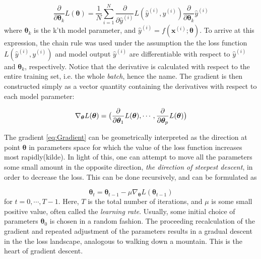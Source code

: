 \begin{equation}\label{eq:LossDerivateWRTparameter}
    \frac{\partial}{\partial \boldsymbol{\theta}_k} L(\boldsymbol{\theta}) =
    \frac{1}{N}\sum_{i=1}^{N} \frac{\partial}{\partial \hat{y}^{(i)}} L( \hat{y}^{(i)}, y^{(i)})
    \frac{\partial}{\partial \boldsymbol{\theta}_k}\hat{y}^{(i)}
\end{equation}
where $\boldsymbol{\theta}_k$ is the k'th model parameter, and  $\hat{y}^{(i)} = f(\boldsymbol{x}^{(i)}; \boldsymbol{\theta})$. To arrive at this expression, the chain rule was used under the assumption the the loss function $L(\hat{y}^{(i)}, y^{(i)})$ and model output $\hat{y}^{(i)}$ are differentiable with respect to $\hat{y}^{(i)}$ and $\boldsymbol{\theta}_k$, respectively. Notice that the derivative is calculated with respect to the entire training set, i.e. the whole \emph{batch}, hence the name. The gradient is then constructed simply as a vector quantity containing the derivatives with respect to each model parameter:

\begin{equation}\label{eq:Gradient}
    \nabla_{\boldsymbol{\theta}} L(\boldsymbol{\theta})= 
    \big{(} \frac{\partial}{\partial \boldsymbol{\theta}_1} L(\boldsymbol{\theta}), 
    \cdots, \frac{\partial}{\partial \boldsymbol{\theta}_p} L(\boldsymbol{\theta}) \big{)}
\end{equation}

The gradient \autoref{eq:Gradient} can be geometrically interpreted as  the direction at point $\boldsymbol{\theta}$ in parameters space for which the value of the loss function increases most rapidly(kilde). In light of this, one can attempt to move all the parameters some small amount in the opposite direction, \emph{the direction of steepest descent}, in order to decrease the loss. This can be done recursively, and can be formulated as 


\begin{equation}\label{eq:ParameterUpdate}
    \boldsymbol{\theta}_{t} = \boldsymbol{\theta}_{t-1} - \mu \nabla_{\boldsymbol{\theta}} L(\boldsymbol{\theta}_{t-1})
\end{equation}
for $t=0, \cdots, T-1$. Here, $T$ is the total number of iterations, and $\mu$ is some small positive value, often called the \emph{learning rate}. Usually, some initial choice of parameters $\boldsymbol{\theta}_{0}$ is chosen in a random fashion. The proceeding recalculation of the gradient and repeated adjustment of the parameters results in a gradual descent in the the loss landscape, analogous to walking down a mountain. This is the heart of gradient descent.

